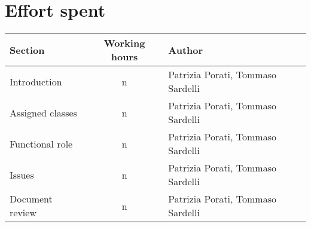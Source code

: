 \pagebreak
\section{Effort spent}

	\begin{center}
		\begin{tabular}{ l c l } 
			\hline
			\textbf{Section} 	& \textbf{Working hours} 	& \textbf{Author} \\ 
			\hline
			Introduction 	& n 	& Patrizia Porati, Tommaso Sardelli	\\
			Assigned classes	 	& n 	& Patrizia Porati, Tommaso Sardelli	\\
			Functional role 	& n 	& Patrizia Porati, Tommaso Sardelli \\ 
			Issues 	& n 	& Patrizia Porati, Tommaso Sardelli \\
			Document review 	& n 	& Patrizia Porati, Tommaso Sardelli \\
			\hline
		\end{tabular}
		\vspace{0.4cm}
	\end{center}
